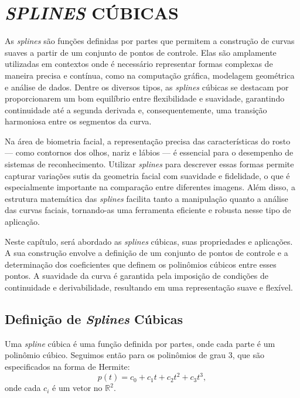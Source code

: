 \chapter{\textit{SPLINES} CÚBICAS} \label{cha:splines}

As \textit{splines} são funções definidas por partes que permitem a construção de curvas suaves a partir de um conjunto de pontos de controle. Elas são amplamente utilizadas em contextos onde é necessário representar formas complexas de maneira precisa e contínua, como na computação gráfica, modelagem geométrica e análise de dados. Dentre os diversos tipos, as \textit{splines} cúbicas se destacam por proporcionarem um bom equilíbrio entre flexibilidade e suavidade, garantindo continuidade até a segunda derivada e, consequentemente, uma transição harmoniosa entre os segmentos da curva.

Na área de biometria facial, a representação precisa das características do rosto — como contornos dos olhos, nariz e lábios — é essencial para o desempenho de sistemas de reconhecimento. Utilizar \textit{splines} para descrever essas formas permite capturar variações sutis da geometria facial com suavidade e fidelidade, o que é especialmente importante na comparação entre diferentes imagens. Além disso, a estrutura matemática das \textit{splines} facilita tanto a manipulação quanto a análise das curvas faciais, tornando-as uma ferramenta eficiente e robusta nesse tipo de aplicação.

Neste capítulo, será abordado as \textit{splines} cúbicas, suas propriedades e aplicações. A sua construção envolve a definição de um conjunto de pontos de controle e a determinação dos coeficientes que definem os polinômios cúbicos entre esses pontos. A suavidade da curva é garantida pela imposição de condições de continuidade e derivabilidade, resultando em uma representação suave e flexível.

\section{Definição de \textit{Splines} Cúbicas}
\label{sec:definicao-splines-cubicas}
Uma \textit{spline} cúbica é uma função definida por partes, onde cada parte é um polinômio cúbico. Seguimos então para os polinômios de grau 3, que são especificados na forma de Hermite:
\begin{equation}
    p(t) = c_0 + c_1t + c_2t^2 + c_3t^3,
\end{equation}
onde cada $c_i$ é um vetor no $\mathbb{R}^2$.

